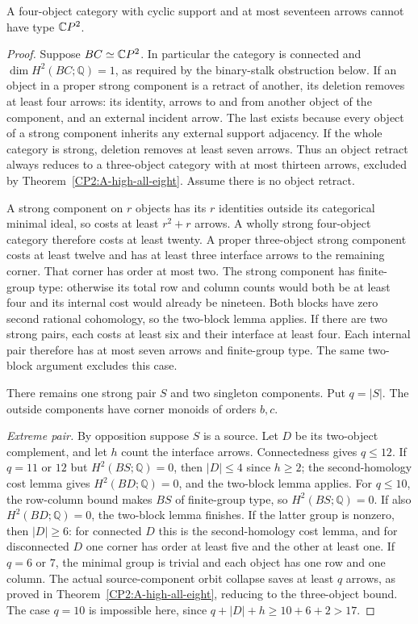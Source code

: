 \begin{theorem}
\label{CP2:A-strong-four-seventeen}
A four-object category with cyclic support and at most
seventeen arrows cannot have type $\mathbb{C}P^2$.
\end{theorem}
\begin{proof}
Suppose $BC\simeq\mathbb{C}P^2$. In particular the category is
connected and $\dim H^2(BC;\mathbb Q)=1$, as required
by the binary-stalk obstruction below. If an object in a proper strong
component is a retract of another, its deletion removes
at least four arrows: its identity, arrows to and from
another object of the component, and an external incident
arrow. The last exists because every object of a strong
component inherits any external support adjacency. If the
whole category is strong, deletion removes at least seven
arrows. Thus an object retract always reduces to a
three-object category with at most thirteen arrows,
excluded by Theorem~\ref{CP2:A-high-all-eight}. Assume
there is no object retract.

A strong component on $r$ objects has its $r$ identities
outside its categorical minimal ideal, so costs at least
$r^2+r$ arrows. A wholly strong four-object category
therefore costs at least twenty. A proper three-object
strong component costs at least twelve and has at least
three interface arrows to the remaining corner. That
corner has order at most two. The strong component has
finite-group type: otherwise its total row and column
counts would both be at least four and its internal cost
would already be nineteen. Both blocks have zero second
rational cohomology, so the two-block lemma applies.
If there are two strong pairs, each costs at least six
and their interface at least four. Each internal pair
therefore has at most seven arrows and finite-group type.
The same two-block argument excludes this case.

There remains one strong pair $S$ and two singleton
components. Put $q=|S|$. The outside components have
corner monoids of orders $b,c$.

\emph{Extreme pair.} By opposition suppose $S$ is a
source. Let $D$ be its two-object complement, and let
$h$ count the interface arrows. Connectedness gives
$q\le12$. If $q=11$ or $12$ but $H^2(BS;\mathbb Q)=0$,
then $|D|\le4$ since $h\ge2$; the second-homology cost
lemma gives $H^2(BD;\mathbb Q)=0$, and the two-block
lemma applies. For $q\le10$, the row-column bound makes
$BS$ of finite-group type, so $H^2(BS;\mathbb Q)=0$.
If also $H^2(BD;\mathbb Q)=0$, the two-block lemma
finishes. If the latter group is nonzero, then $|D|\ge6$:
for connected $D$ this is the second-homology cost lemma,
and for disconnected $D$ one corner has order at least
five and the other at least one. If $q=6$ or $7$, the
minimal group is trivial and each object has one row
and one column. The actual source-component orbit
collapse saves at least $q$ arrows, as proved in
Theorem~\ref{CP2:A-high-all-eight}, reducing to the
three-object bound. The case $q=10$ is impossible here,
since $q+|D|+h\ge10+6+2>17$.


\end{proof}
